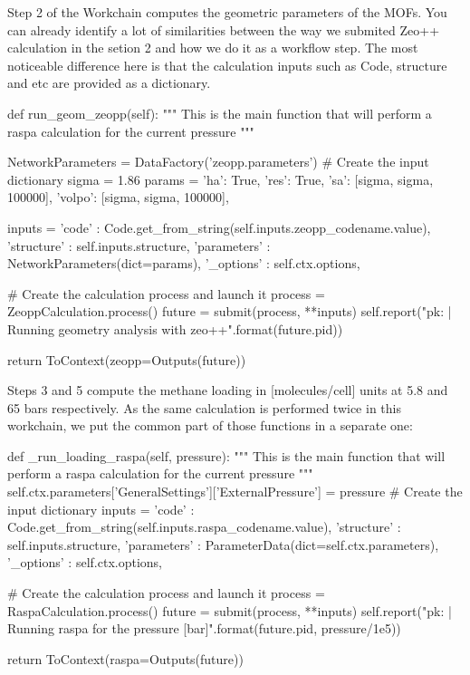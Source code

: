 \documentclass[twoside,a4paper,11pt]{extarticle}
\begin{document}
Step 2 of the Workchain computes the geometric parameters of the MOFs. You can already identify a lot of similarities between the way we submited Zeo++ calculation in the setion 2 and how we do it as a workflow step. The most noticeable difference here is that the calculation inputs such as Code, structure and etc are provided as a dictionary. 

\begin{pythoncommand}
def run_geom_zeopp(self):
    """
    This is the main function that will perform a raspa
    calculation for the current pressure
    """

    NetworkParameters = DataFactory('zeopp.parameters')
    # Create the input dictionary
    sigma = 1.86
    params = {
        'ha': True,
        'res': True,
        'sa': [sigma, sigma, 100000],
        'volpo': [sigma, sigma, 100000],
    }

    inputs = {
        'code'       : Code.get_from_string(self.inputs.zeopp_codename.value),
        'structure'  : self.inputs.structure,
        'parameters' : NetworkParameters(dict=params),
        '_options'   : self.ctx.options,
    }

    # Create the calculation process and launch it
    process = ZeoppCalculation.process()
    future  = submit(process, **inputs)
    self.report("pk: {} | Running geometry analysis with zeo++".format(future.pid))

    return ToContext(zeopp=Outputs(future))
\end{pythoncommand}

Steps 3 and 5 compute the methane loading in [molecules/cell] units at 5.8 and 65 bars respectively. As the same calculation is performed twice in this workchain, we put the common part of those functions in a separate one:

\begin{pythoncommand}
def _run_loading_raspa(self, pressure):
    """
    This is the main function that will perform a raspa
    calculation for the current pressure
    """
    self.ctx.parameters['GeneralSettings']['ExternalPressure'] = pressure
    # Create the input dictionary
    inputs = {
        'code'       : Code.get_from_string(self.inputs.raspa_codename.value),
        'structure'  : self.inputs.structure,
        'parameters' : ParameterData(dict=self.ctx.parameters),
        '_options'   : self.ctx.options,
    }

    # Create the calculation process and launch it
    process = RaspaCalculation.process()
    future  = submit(process, **inputs)
    self.report("pk: {} | Running raspa for the pressure {} [bar]".format(future.pid, pressure/1e5))

    return ToContext(raspa=Outputs(future))
\end{pythoncommand}
\end{document}
